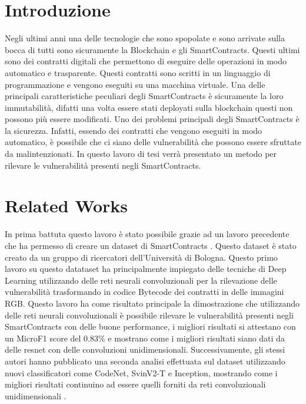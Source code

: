\documentclass[12pt,a4paper]{report}
\begin{document}
\chapter{Introduzione}
Negli ultimi anni una delle tecnologie che sono spopolate e sono arrivate sulla bocca di tutti sono sicuramente la Blockchain e gli SmartContracts. Questi ultimi sono dei contratti digitali che permettono di eseguire delle operazioni in modo automatico e trasparente. Questi contratti sono scritti in un linguaggio di programmazione e vengono eseguiti su una macchina virtuale. Una delle principali caratteristiche peculiari degli SmartContracts è sicuramente la loro immutabilità, difatti una volta essere stati deployati sulla blockchain questi non possono più essere modificati.  Uno dei problemi principali degli SmartContracts è la sicurezza. Infatti, essendo dei contratti che vengono eseguiti in modo automatico, è possibile che ci siano delle vulnerabilità che possono essere sfruttate da malintenzionati. In questo lavoro di tesi verrà presentato un metodo per rilevare le vulnerabilità presenti negli SmartContracts. 
\chapter{Related Works}
In prima battuta questo lavoro è stato possibile grazie ad un lavoro precedente che ha permesso di creare un dataset di SmartContracts \cite{RossiniPaper1}. Questo dataset è stato creato da un gruppo di ricercatori dell'Università di Bologna. Questo primo lavoro su questo datataset ha principalmente impiegato delle tecniche di Deep Learning utilizzando delle reti neurali convoluzionali per la rilevazione delle vulnerabilità trasformando in codice Bytecode dei contratti in delle immagini RGB. Questo lavoro ha  come risultato principale la dimostrazione che utilizzando delle reti neurali convoluzionali è possibile rilevare le vulnerabilità presenti negli SmartContracts con delle buone performance, i migliori risultati si attestano con un MicroF1 score del 0.83\% e mostrano come i migliori risultati siano dati da delle resnet con delle convoluzioni unidimensionali. Successivamente, gli stessi autori hanno pubblicato una seconda analisi effettuata sul dataset utilizzando nuovi classificatori come CodeNet, SvinV2-T e Inception, mostrando come i migliori risultati  continuino ad essere quelli forniti da reti convoluzionali unidimensionali \cite{RossiniPaper2}.



\nocite{*}
\end{document}

